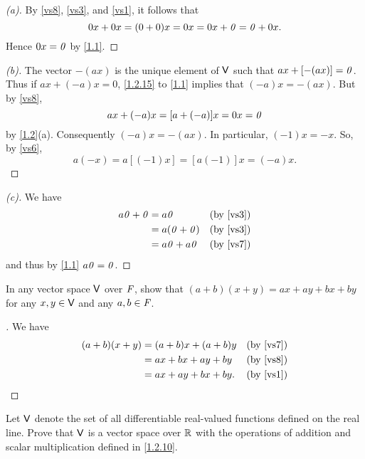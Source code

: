 \begin{proof}[(a)]
  By \ref{vs8}, \ref{vs3}, and \ref{vs1}, it follows that
  \[
    0x + 0x = (0 + 0) x = 0x = 0x + \mathit{0} = \mathit{0} + 0x.
  \]
  Hence \(0x = \mathit{0}\) by \cref{1.1}.
\end{proof}

\begin{proof}[(b)]
  The vector \(-(ax)\) is the unique element of \(\mathsf{V}\) such that \(ax + [-(ax)] = \mathit{0}\).
  Thus if \(ax + (-a)x = 0\), \cref{1.2.15} to \cref{1.1} implies that \((-a)x = -(ax)\).
  But by \ref{vs8},
  \[
    ax + (-a)x = [a + (-a)]x = 0x = \mathit{0}
  \]
  by \cref{1.2}(a).
  Consequently \((-a)x = -(ax)\).
  In particular, \((-1)x = -x\).
  So, by \ref{vs6},
  \[
    a(-x) = a[(-1)x] = [a(-1)]x = (-a)x.
  \]
\end{proof}

\begin{proof}[(c)]
  We have
  \begin{align*}
    a\mathit{0} + \mathit{0} & = a\mathit{0}         &  & \text{(by \ref{vs3})} \\
               & = a(\mathit{0} + \mathit{0}) &  & \text{(by \ref{vs3})} \\
               & = a\mathit{0} + a\mathit{0}  &  & \text{(by \ref{vs7})}
  \end{align*}
  and thus by \cref{1.1} \(a\mathit{0} = \mathit{0}\).
\end{proof}

\exercisesection

\setcounter{ex}{7}
\begin{ex}\label{ex:1.2.8}
  In any vector space \(\mathsf{V}\) over \(\mathit{F}\), show that \((a + b)(x + y) = ax + ay + bx + by\) for any \(x, y \in \mathsf{V}\) and any \(a, b \in \mathit{F}\).
\end{ex}

\begin{proof}[]
  We have
  \begin{align*}
    (a + b)(x + y) & = (a + b) x + (a + b) y &  & \text{(by \ref{vs7})} \\
                   & = ax + bx + ay + by     &  & \text{(by \ref{vs8})} \\
                   & = ax + ay + bx + by.    &  & \text{(by \ref{vs1})}
  \end{align*}
\end{proof}

\setcounter{ex}{9}
\begin{ex}\label{ex:1.2.10}
  Let \(\mathsf{V}\) denote the set of all differentiable real-valued functions defined on the real line.
  Prove that \(\mathsf{V}\) is a vector space over \(\mathbb{R}\) with the operations of addition and scalar multiplication defined in \cref{1.2.10}.
\end{ex}

